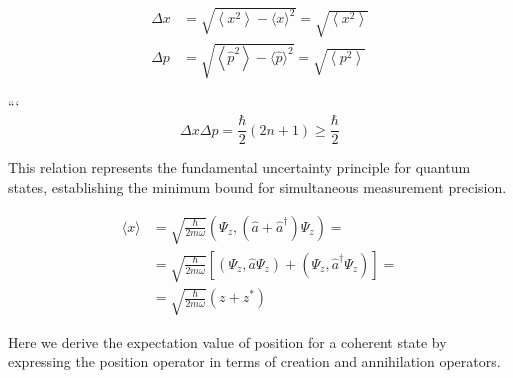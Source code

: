 \documentclass[italian]{HKNdocument}
\begin{document}
\begin{align*}
\Delta x & =\sqrt{\left\langle x^{2}\right\rangle-\langle x\rangle^{2}}=\sqrt{\left\langle x^{2}\right\rangle} \\
\Delta p & =\sqrt{\left\langle\hat{p}^{2}\right\rangle-\langle\hat{p}\rangle^{2}}=\sqrt{\left\langle p^{2}\right\rangle} \tag{7.68}
\end{align*}

```
\begin{equation*}
\Delta x \Delta p=\frac{\hbar}{2}(2 n+1) \geq \frac{\hbar}{2} \tag{7.69}
\end{equation*}

This relation represents the fundamental uncertainty principle for quantum states, establishing the minimum bound for simultaneous measurement precision.

\begin{align*}
\langle x\rangle & =\sqrt{\frac{\hbar}{2 m \omega}}\left(\Psi_{z},\left(\hat{a}+\hat{a}^{\dagger}\right) \Psi_{z}\right)= \\
& =\sqrt{\frac{\hbar}{2 m \omega}}\left[\left(\Psi_{z}, \hat{a} \Psi_{z}\right)+\left(\Psi_{z}, \hat{a}^{\dagger} \Psi_{z}\right)\right]=  \tag{7.70}\\
& =\sqrt{\frac{\hbar}{2 m \omega}}\left(z+z^{*}\right)
\end{align*}

Here we derive the expectation value of position for a coherent state by expressing the position operator in terms of creation and annihilation operators.
\end{document}
